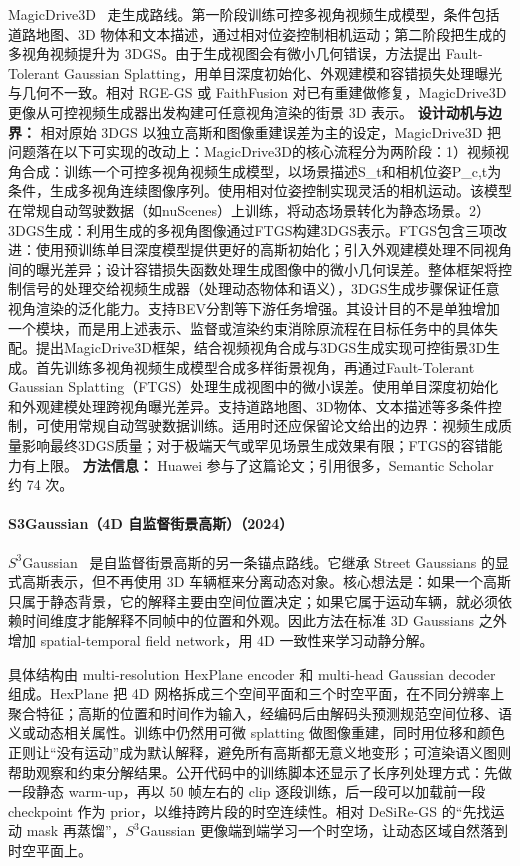MagicDrive3D~\cite{2405_14475} 走生成路线。第一阶段训练可控多视角视频生成模型，条件包括道路地图、3D 物体和文本描述，通过相对位姿控制相机运动；第二阶段把生成的多视角视频提升为 3DGS。由于生成视图会有微小几何错误，方法提出 Fault-Tolerant Gaussian Splatting，用单目深度初始化、外观建模和容错损失处理曝光与几何不一致。相对 RGE-GS 或 FaithFusion 对已有重建做修复，MagicDrive3D 更像从可控视频生成器出发构建可任意视角渲染的街景 3D 表示。
\textbf{设计动机与边界：} 相对原始 3DGS 以独立高斯和图像重建误差为主的设定，MagicDrive3D 把问题落在以下可实现的改动上：MagicDrive3D的核心流程分为两阶段：1）视频视角合成：训练一个可控多视角视频生成模型，以场景描述S\_t和相机位姿P\_c,t为条件，生成多视角连续图像序列。使用相对位姿控制实现灵活的相机运动。该模型在常规自动驾驶数据（如nuScenes）上训练，将动态场景转化为静态场景。2）3DGS生成：利用生成的多视角图像通过FTGS构建3DGS表示。FTGS包含三项改进：使用预训练单目深度模型提供更好的高斯初始化；引入外观建模处理不同视角间的曝光差异；设计容错损失函数处理生成图像中的微小几何误差。整体框架将控制信号的处理交给视频生成器（处理动态物体和语义），3DGS生成步骤保证任意视角渲染的泛化能力。支持BEV分割等下游任务增强。其设计目的不是单独增加一个模块，而是用上述表示、监督或渲染约束消除原流程在目标任务中的具体失配。提出MagicDrive3D框架，结合视频视角合成与3DGS生成实现可控街景3D生成。首先训练多视角视频生成模型合成多样街景视角，再通过Fault-Tolerant Gaussian Splatting（FTGS）处理生成视图中的微小误差。使用单目深度初始化和外观建模处理跨视角曝光差异。支持道路地图、3D物体、文本描述等多条件控制，可使用常规自动驾驶数据训练。适用时还应保留论文给出的边界：视频生成质量影响最终3DGS质量；对于极端天气或罕见场景生成效果有限；FTGS的容错能力有上限。
\textbf{方法信息：} Huawei 参与了这篇论文；引用很多，Semantic Scholar 约 74 次。



\paragraph{S3Gaussian（4D 自监督街景高斯）（2024）}
$S^3$Gaussian~\cite{2405_20323} 是自监督街景高斯的另一条锚点路线。它继承 Street Gaussians 的显式高斯表示，但不再使用 3D 车辆框来分离动态对象。核心想法是：如果一个高斯只属于静态背景，它的解释主要由空间位置决定；如果它属于运动车辆，就必须依赖时间维度才能解释不同帧中的位置和外观。因此方法在标准 3D Gaussians 之外增加 spatial-temporal field network，用 4D 一致性来学习动静分解。

具体结构由 multi-resolution HexPlane encoder 和 multi-head Gaussian decoder 组成。HexPlane 把 4D 网格拆成三个空间平面和三个时空平面，在不同分辨率上聚合特征；高斯的位置和时间作为输入，经编码后由解码头预测规范空间位移、语义或动态相关属性。训练中仍然用可微 splatting 做图像重建，同时用位移和颜色正则让“没有运动”成为默认解释，避免所有高斯都无意义地变形；可渲染语义图则帮助观察和约束分解结果。公开代码中的训练脚本还显示了长序列处理方式：先做一段静态 warm-up，再以 50 帧左右的 clip 逐段训练，后一段可以加载前一段 checkpoint 作为 prior，以维持跨片段的时空连续性。相对 DeSiRe-GS 的“先找运动 mask 再蒸馏”，$S^3$Gaussian 更像端到端学习一个时空场，让动态区域自然落到时空平面上。

